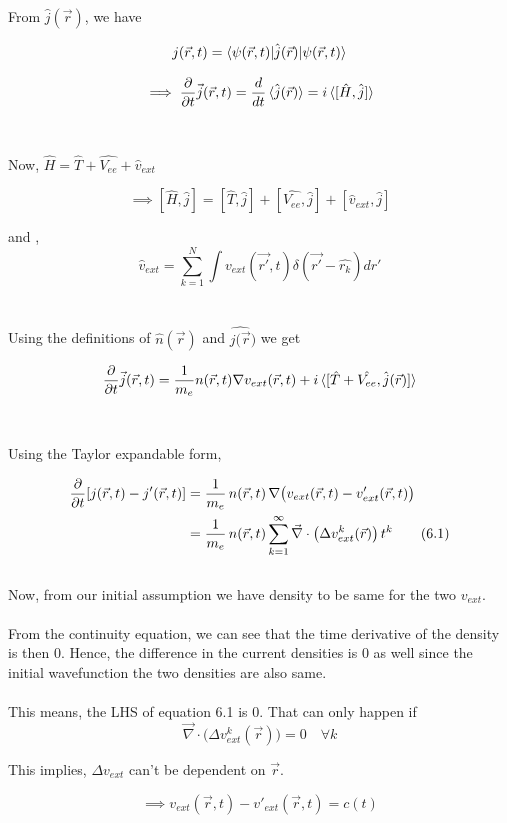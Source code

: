 \documentclass[12pt]{article}
\begin{document}
From $\hat{j}(\vec{r})$, we have 

\[ j(\vec{r},t) =\braket{\psi(\vec{r},t) | \hat{j}(\vec{r}) | \psi(\vec{r},t)} \]

 \[ \implies \frac{\partial}{\partial t}\vec{j}(\vec{r},t) = \frac{d}{dt} \braket{\hat{j}(\vec{r})} = i \braket{[\hat{H},\hat{j}]} \]
\\
\\
Now, $\hat{H} = \hat{T} +\hat{V_{ee}} + \hat{v}_{ext} $

 \[ \implies [\hat{H},\hat{j}] = [\hat{T},\hat{j}] + [\hat{V_{ee}},\hat{j}] + [\hat{v}_{ext},\hat{j}] \]

and , \[ \hat{v}_{ext} = \sum_{k=1}^{N} \int v_{ext}(\vec{r'},t) \delta(\vec{r'} - \hat{r_k}) dr'  \]
\\
\\
Using the definitions of $\hat{n}(\vec{r})$ and $\hat{j(\vec{r}})$ we get

\[ \frac{\partial}{\partial t}\vec{j}(\vec{r},t) = \frac{1}{m_e} n(\vec{r},t) \nabla  v_{ext}(\vec{r},t) + 
i \braket{[\hat{T} + \hat{V_{ee}},\hat{j}(\vec{r})]} \]
\\
\\
Using the Taylor expandable form, 

\begin{align}
\frac{\partial}{\partial t} [j(\vec{r},t) - j'(\vec{r},t)] 
    &= \frac{1}{m_e} \, n(\vec{r},t) \, \nabla \big( v_{ext}(\vec{r},t) - v'_{ext}(\vec{r},t) \big) \notag \\
    &= \frac{1}{m_e} \, n(\vec{r},t) \sum_{k=1}^{\infty} \vec{\nabla} \cdot \big( \Delta v_{ext}^{k}(\vec{r}) \big) \, t^k
    \tag{6.1}
\end{align}
\\
Now, from our initial assumption we have density to be same for the two $v_{ext}$.
\\
\\
From the continuity equation, we can see that the time derivative of the density is then 0. Hence, 
the difference in the current densities is 0 as well since the initial wavefunction the two densities are also same. 
\\
\\
This means, the LHS of equation 6.1 is 0. That can only happen if 
\[ \vec{\nabla} \cdot \big( \Delta v_{ext}^{k}(\vec{r})\big) = 0 \quad \forall k \]

 This implies, $\Delta v_{ext}$ can't be dependent on $\vec{r}$.

 \[ \implies v_{ext}(\vec{r},t) - v'_{ext}(\vec{r},t) = c(t) \]
\end{document}
